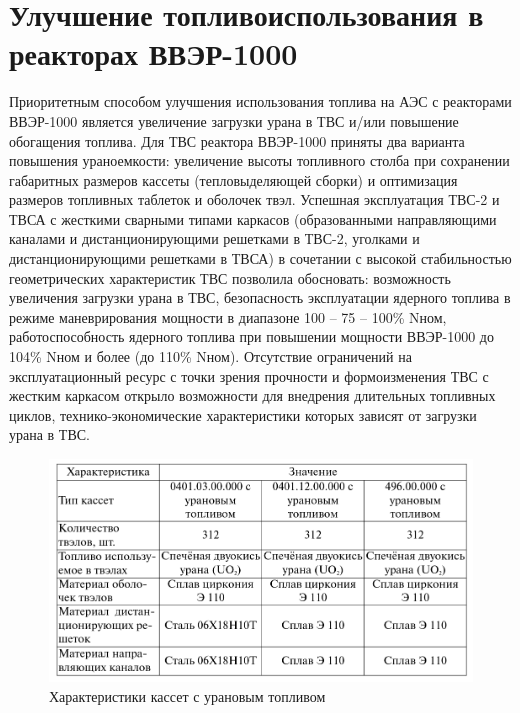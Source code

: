 \documentclass[14pt]{article}
\begin{document}
	\section{Улучшение топливоиспользования в реакторах ВВЭР-1000}
	\hspace{0.4cm}
	Приоритетным  способом  улучшения  использования  топлива  на  АЭС  с  реакторами ВВЭР-1000  является  увеличение  загрузки  урана  в  ТВС и/или  повышение  обогащения топлива.  Для  ТВС  реактора  ВВЭР-1000  приняты  два  варианта  повышения  ураноемкости: увеличение  высоты  топливного  столба  при  сохранении габаритных  размеров  кассеты (тепловыделяющей сборки) и оптимизация размеров топливных таблеток и оболочек твэл. Успешная  эксплуатация ТВС-2  и  ТВСА  с  жесткими  сварными  типами  каркасов (образованными  направляющими  каналами  и  дистанционирующими  решетками  в  ТВС-2, уголками   и   дистанционирующими   решетками   в   ТВСА)   в   сочетании   с   высокой стабильностью  геометрических  характеристик  ТВС  позволила  обосновать:  возможность увеличения  загрузки  урана  в  ТВС,  безопасность  эксплуатации  ядерного  топлива  в  режиме маневрирования мощности в диапазоне 100 – 75 – 100\% Nном, работоспособность ядерного топлива  при  повышении  мощности  ВВЭР-1000  до  104\%  Nном  и  более  (до  110\% Nном). Отсутствие  ограничений  на  эксплуатационный  ресурс  с  точки  зрения  прочности  и формоизменения ТВС с жестким каркасом открыло возможности для внедрения длительных топливных  циклов,  технико-экономические  характеристики  которых  зависят  от  загрузки урана в ТВС. 
	
	
	\begin{figure}
	    \centering
	    \includegraphics[width=\linewidth]{Picture2}
	    \caption{Характеристики кассет с урановым топливом}
	    \label{fig:my_label}
	\end{figure}
	
\end{document}
